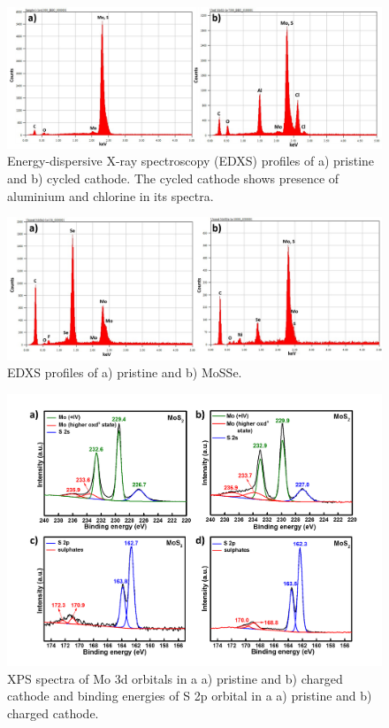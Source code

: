 \begin{figure}[tbh!]
\centering
\includegraphics[width=\textwidth]{Figures/appendix/mos2edxpt}
\caption{Energy-dispersive X-ray spectroscopy (EDXS) profiles of a) pristine  and b) cycled  cathode. The cycled cathode shows presence of aluminium and chlorine in its spectra.}
\label{Figures/appendix:mos2edxpt}
\end{figure}
\begin{figure}[tbh!]
\centering
\includegraphics[width=\textwidth]{Figures/appendix/mose2mosseprt}
\caption{EDXS profiles of a) pristine  and b) MoSSe. }
\label{Figures/appendix:mose2mosse}
\end{figure}
\begin{figure}
  \centering
  \includegraphics[width=\textwidth]{Figures/appendix/MoS2XPS}
  \caption{XPS spectra of Mo 3d orbitals in a a) pristine and b) charged  cathode and binding energies of S 2p orbital in a a) pristine and b) charged  cathode.}
  \label{Figures/appendix:MoS2XPS}
\end{figure}
